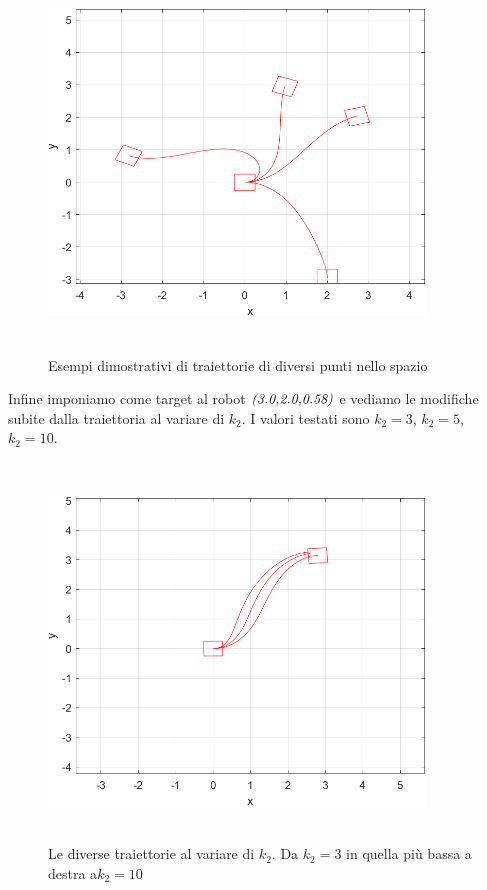 \documentclass[a4paper,11 pt,oneside]{book}
\theoremstyle{definition}
\begin{document}
\begin{figure}[!htbp]
\includegraphics[width=10cm, height=10cm]{pos2.png}
\centering
\caption{Esempi dimostrativi di traiettorie di diversi punti nello spazio}
\label{burger}
\end{figure}
\vspace{7cm}
Infine imponiamo come target al robot $\emph{(3.0,2.0,0.58)}$ e vediamo le modifiche subite dalla traiettoria al variare di $k_2$. I valori testati sono $k_2=3$, $k_2=5$, $k_2=10$.
\begin{figure}[!h]
\includegraphics[width=10cm, height=10cm]{pos1.png}
\centering
\caption{Le diverse traiettorie al variare di $k_2$. Da $k_2=3$ in quella più bassa a destra a$k_2=10$ }
\label{burger}
\end{figure}
\end{document}
